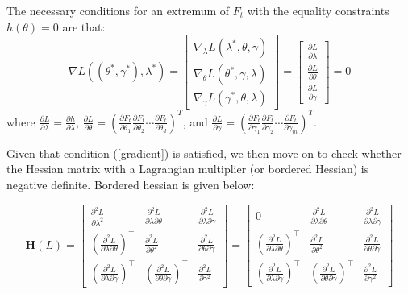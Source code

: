 \documentclass[a4paper,12pt,times,numbered,print,index]{report}
\numberwithin{equation}{section}
\begin{document}
	The necessary conditions for an extremum of $F_t$ with the equality constraints $h(\theta)=0$ are that:
	\begin{equation}
		\nabla L((\theta^{*},\gamma^{*}), \lambda^{*})=\left[\begin{array}{c}
			\nabla_{\lambda} L(\lambda^{*}, \theta, \gamma) \\
			\nabla_{\theta} L(\theta^{*}, \gamma, \lambda) \\
			\nabla_{\gamma} L(\gamma^{*}, \theta, \lambda) 
		\end{array}\right]
		= 
		\left[\begin{array}{c}
			\frac{\partial L}{\partial \lambda}\\
			\frac{\partial L}{\partial \theta}\\
			\frac{\partial L}{\partial \gamma}
		\end{array}\right]
		= 0
		\label{gradient}
	\end{equation} 
	where $\frac{\partial L}{\partial \lambda} = \frac{\partial h}{\partial \lambda}$, $\frac{\partial L}{\partial \theta} = \left(\frac{\partial F_t}{\partial \theta_1} \frac{\partial F_t}{\partial \theta_2} \cdots \frac{\partial F_t}{\partial \theta_d}\right)^{T}$, and $\frac{\partial L}{\partial \gamma} = \left(\frac{\partial F_t}{\partial \gamma_1} \frac{\partial F_t}{\partial \gamma_2} \cdots \frac{\partial F_t}{\partial \gamma_m}\right)^{T}$.
	
	Given that condition (\ref{gradient}) is satisfied, we then move on to check whether the Hessian matrix with a Lagrangian multiplier (or bordered Hessian) is negative definite. Bordered hessian is given below:
	
	\begin{equation}
		\mathbf{H}(L)=\left[\begin{array}{ccc}
			\frac{\partial^{2} L}{\partial \lambda^{2}} & \frac{\partial^{2} L}{\partial \lambda \partial \theta} & \frac{\partial^{2} L}{\partial \lambda \partial \gamma} \\
			\left(\frac{\partial^{2} L}{\partial \lambda \partial \theta}\right)^{\top} & \frac{\partial^{2} L}{\partial \theta^{2}} & \frac{\partial^{2} L}{\partial \theta \partial \gamma} \\ \left(\frac{\partial^{2} L}{\partial \lambda \partial \gamma}\right)^{\top} & \left(\frac{\partial^{2} L}{\partial \theta \partial \gamma}\right)^{\top} & \frac{\partial^{2} L}{\partial \gamma^{2}}
		\end{array}\right] = \left[\begin{array}{ccc}
			0 & \frac{\partial^{2} L}{\partial \lambda \partial \theta} & \frac{\partial^{2} L}{\partial \lambda \partial \gamma} \\
			\left(\frac{\partial^{2} L}{\partial \lambda \partial \theta}\right)^{\top} & \frac{\partial^{2} L}{\partial \theta^{2}} & \frac{\partial^{2} L}{\partial \theta \partial \gamma} \\ \left(\frac{\partial^{2} L}{\partial \lambda \partial \gamma}\right)^{\top} & \left(\frac{\partial^{2} L}{\partial \theta \partial \gamma}\right)^{\top} & \frac{\partial^{2} L}{\partial \gamma^{2}}
		\end{array}\right]
	\end{equation}
	
\end{document}
